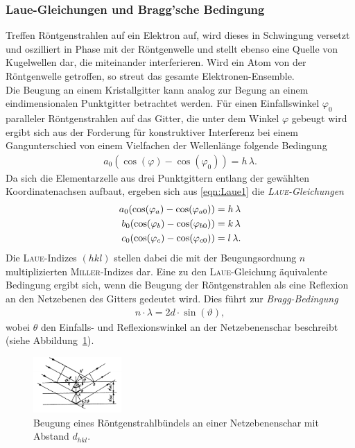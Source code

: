 \documentclass[a4paper,twoside,final]{article}
\begin{document}
\subsubsection{Laue-Gleichungen und Bragg'sche Bedingung}
Treffen Röntgenstrahlen auf ein Elektron auf, wird dieses in Schwingung versetzt und oszilliert in Phase mit der Röntgenwelle und stellt ebenso eine Quelle von Kugelwellen dar, die miteinander interferieren. Wird ein Atom von der Röntgenwelle getroffen, so streut das gesamte Elektronen-Ensemble.\\
Die Beugung an einem Kristallgitter kann analog zur Begung an einem eindimensionalen Punktgitter betrachtet werden. Für einen Einfallswinkel $\varphi_0$ paralleler Röntgenstrahlen auf das Gitter, die unter dem Winkel $\varphi$ gebeugt wird ergibt sich aus der Forderung für konstruktiver Interferenz bei einem Gangunterschied von einem Vielfachen der Wellenlänge folgende Bedingung
\begin{align}
  a_0 (\cos(\varphi) - \cos(\varphi_0)) = h\,\lambda.\label{eqn:Laue1}
\end{align}
Da sich die Elementarzelle aus drei Punktgittern entlang der gewählten Koordinatenachsen aufbaut, ergeben sich aus \eqref{eqn:Laue1} die \textit{\textsc{Laue}-Gleichungen}
\begin{align}\label{eqn:Laue2}
  a_0 (\cos(\varphi_a) - \cos(\varphi_{a0})) &= h\,\lambda\notag\\
  b_0 (\cos(\varphi_b) - \cos(\varphi_{b0})) &= k\,\lambda\\
  c_0 (\cos(\varphi_c) - \cos(\varphi_{c0})) &= l\,\lambda\notag.
\end{align}
Die \textsc{Laue}-Indizes $(hkl)$ stellen dabei die mit der Beugungsordnung $n$ multiplizierten \textsc{Miller}-Indizes dar.
Eine zu den \textsc{Laue}-Gleichung äquivalente Bedingung ergibt sich, wenn die Beugung der Röntgenstrahlen als eine Reflexion an den Netzebenen des Gitters gedeutet wird.  Dies führt zur \textit{Bragg-Bedingung}
\begin{align}
  n\cdot \lambda = 2d\cdot \sin(\vartheta),
\end{align}
wobei $\theta$ den Einfalls- und Reflexionswinkel an der Netzebenenschar beschreibt (siehe Abbildung~\ref{fig:Roentgenbeugung}).
\begin{figure}[htp]
    \centering
    \includegraphics[width=0.3\textwidth]{Abbildungen/Roentgenbeugung.pdf}
    \caption{Beugung eines Röntgenstrahlbündels an einer Netzebenenschar mit Abstand $d_{hkl}$.~\cite[S.367]{Kleber}}
    \label{fig:Roentgenbeugung}
\end{figure}\\
\end{document}
